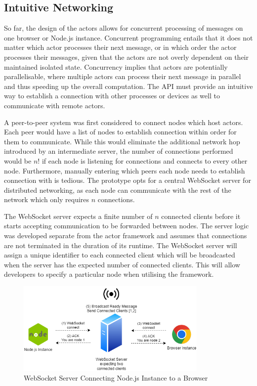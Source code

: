 \documentclass[12pt, a4paper]{report}
\theoremstyle{definition}
\theoremstyle{definition}%
\theoremstyle{definition}%
\theoremstyle{definition}%
\theoremstyle{definition}%
\theoremstyle{definition}%
\begin{document}
\subsection{Intuitive Networking}
So far, the design of the actors allows for concurrent processing of messages on one browser or Node.js instance. Concurrent programming entails that it does not matter which actor processes their next message, or in which order the actor processes their messages, given that the actors are not overly dependent on their maintained isolated state. Concurrency implies that actors are potentially parallelisable, where multiple actors can process their next message in parallel and thus speeding up the overall computation. The API must provide an intuitive way to establish a connection with other processes or devices as well to communicate with remote actors.

A peer-to-peer system was first considered to connect nodes which host actors. Each peer would have a list of nodes to establish connection within order for them to communicate. While this would eliminate the additional network hop introduced by an intermediate server, the number of connections performed would be $n!$ if each node is listening for connections and connects to every other node. Furthermore, manually entering which peers each node needs to establish connection with is tedious. The prototype opts for a central WebSocket server for distributed networking, as each node can communicate with the rest of the network which only requires $n$ connections.

The WebSocket server expects a finite number of $n$ connected clients before it starts accepting communication to be forwarded between nodes. The server logic was developed separate from the actor framework and assumes that connections are not terminated in the duration of its runtime. The WebSocket server will assign a unique identifier to each connected client which will be broadcasted when the server has the expected number of connected clients. This will allow developers to specify a particular node when utilising the framework.

\begin{figure}[H]
    \begin{centering}
        \includegraphics[width=350px]{resources/websocketconnection.png}
        \caption{WebSocket Server Connecting Node.js Instance to a Browser}
    \end{centering}
\end{figure}
 
\end{document}
